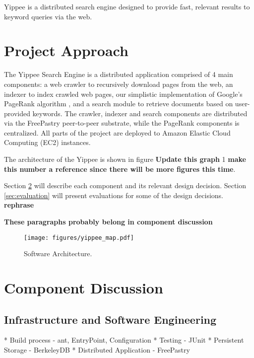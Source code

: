 \documentclass[11pt, letterpaper, oneside, twocolumn]{article}
\begin{document}
Yippee is a distributed search engine designed to provide fast, relevant results to keyword queries via the web.  

\section{Project Approach}
\label{sec:approach}

The Yippee Search Engine is a distributed application comprised of 4 main components: a web crawler to recursively download pages from the web, an indexer to index crawled web pages, our simplistic implementation of Google's PageRank algorithm \cite{pagerank}, and a search module to retrieve documents based on user-provided keywords.  
The crawler, indexer and search components are distributed via the FreePastry peer-to-peer substrate, while the PageRank components is centralized.  All parts of the project are deployed to Amazon Elastic Cloud Computing (EC2) instances.  

The architecture of the Yippee is shown in figure \textbf{Update this graph} 1 \textbf{make this number a reference since there will be more figures this time}.


Section \ref{sec:component} will describe each component and its relevant design decision.
Section \ref{sec:evaluation} will present evaluations for some of the design decisions. \textbf{rephrase}

\textbf{These paragraphs probably belong in component discussion}




\label{sec:SOAR} %
\begin{figure}[!b]
  \centering
  \texttt{[image: figures/yippee\_map.pdf]}
  \caption{Software Architecture.}
\end{figure}



\section{Component Discussion}
\label{sec:component}



\subsection{Infrastructure and Software Engineering}

* Build process - ant, EntryPoint, Configuration
* Testing - JUnit
* Persistent Storage - BerkeleyDB
* Distributed Application - FreePastry 
\end{document}
